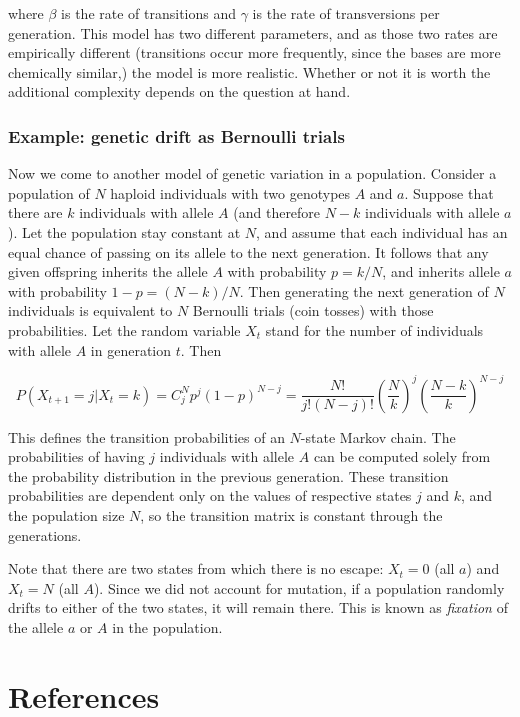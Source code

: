 \documentclass[
  letterpaper,
  DIV=11,
  numbers=noendperiod]{scrreprt}
\newlength{\cslhangindent}
\newenvironment{CSLReferences}[2] %
 {\begin{list}{}{%
  \setlength{\itemindent}{0pt}
  \setlength{\leftmargin}{0pt}
  \setlength{\parsep}{0pt}
  \ifodd #1
   \setlength{\leftmargin}{\cslhangindent}
   \setlength{\itemindent}{-1\cslhangindent}
  \fi
  \setlength{\itemsep}{#2\baselineskip}}}
 {\end{list}}
\begin{document}
where \(\beta\) is the rate of transitions and \(\gamma\) is the rate of
transversions per generation. This model has two different parameters,
and as those two rates are empirically different (transitions occur more
frequently, since the bases are more chemically similar,) the model is
more realistic. Whether or not it is worth the additional complexity
depends on the question at hand.

\subsection{Example: genetic drift as Bernoulli
trials}\label{example-genetic-drift-as-bernoulli-trials}

Now we come to another model of genetic variation in a population.
Consider a population of \(N\) haploid individuals with two genotypes
\(A\) and \(a\). Suppose that there are \(k\) individuals with allele
\(A\) (and therefore \(N-k\) individuals with allele \(a\)). Let the
population stay constant at \(N\), and assume that each individual has
an equal chance of passing on its allele to the next generation. It
follows that any given offspring inherits the allele \(A\) with
probability \(p = k/N\), and inherits allele \(a\) with probability
\(1-p = (N-k)/N\). Then generating the next generation of \(N\)
individuals is equivalent to \(N\) Bernoulli trials (coin tosses) with
those probabilities. Let the random variable \(X_t\) stand for the
number of individuals with allele \(A\) in generation \(t\). Then

\[
P(X_{t+1} = j | X_t = k) = C^N_j p^j (1-p)^{N-j} = \frac{N!}{j! (N-j)!} \left(\frac{N}{k}\right)^j \left(\frac{N-k}{k}\right)^{N-j}
\]

This defines the transition probabilities of an \(N\)-state Markov
chain. The probabilities of having \(j\) individuals with allele \(A\)
can be computed solely from the probability distribution in the previous
generation. These transition probabilities are dependent only on the
values of respective states \(j\) and \(k\), and the population size
\(N\), so the transition matrix is constant through the generations.

Note that there are two states from which there is no escape:
\(X_t = 0\) (all \(a\)) and \(X_t = N\) (all \(A\)). Since we did not
account for mutation, if a population randomly drifts to either of the
two states, it will remain there. This is known as \emph{fixation} of
the allele \(a\) or \(A\) in the population.


\chapter*{References}\label{references}


\label{refs}
\begin{CSLReferences}{0}{1}
\end{CSLReferences}
\end{document}
